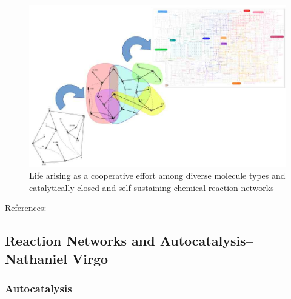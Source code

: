 \documentclass[]{article}
\begin{document}
\begin{figure}[H]
	\caption[Life arising as a cooperative effort
	among diverse molecule types]{Life arising as a cooperative effort
		among diverse molecule types
		and catalytically closed
		and self-sustaining
		chemical reaction networks}\label{fig:CooperativeOrigin}
	\includegraphics[width=\textwidth]{CooperativeOrigin}
\end{figure}

References: \cite{wim2017origin,wim2019wandering,hordijk2012structure,sousa2015autocatalytic}

\subsection[Reaction Networks and Autocatalysis]{Reaction Networks and Autocatalysis--Nathaniel Virgo}

\subsubsection{Autocatalysis}
\end{document}
